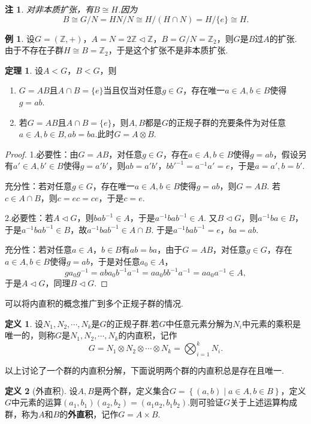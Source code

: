 \documentclass[12pt]{ctexart}
\theoremstyle{definition}
\newtheorem{definition}{定义}
\newtheorem{theorem}{定理}
\newtheorem{example}{例}
\theoremstyle{plain}
\newtheorem*{remark}{注}
\begin{document}
	\begin{remark}
		对非本质扩张，有$B\cong H$.因为
		$$B\cong G/N=HN/N\cong H/(H\cap N)=H/\{e\}\cong H.$$
	\end{remark}
	\begin{example}
		设$G=(\mathbb{Z},+)$，$A=N=2\mathbb{Z}\lhd\mathbb{Z}$，$B=G/N=\mathbb{Z}_2$，则$G$是$B$过$A$的扩张. 由于不存在子群$H\cong B=\mathbb{Z}_2$，于是这个扩张不是非本质扩张.
	\end{example}
	\begin{theorem}
		设$A<G$，$B<G$，则
		\begin{enumerate}
			\item $G=AB$且$A\cap B=\{e\}$当且仅当对任意$g\in G$，存在唯一$a\in A,b\in B$使得$g=ab$.
			\item 若$G=AB$且$A\cap B=\{e\}$，则$A,B$都是$G$的正规子群的充要条件为对任意$a\in A,b\in B,ab=ba$.此时$G=A\otimes B$.
		\end{enumerate}
	\end{theorem}
	\begin{proof}
		1.必要性：由$G=AB$，对任意$g\in G$，存在$a\in A,b\in B$使得$g=ab$，假设另有$a'\in A,b'\in B$使得$g=a'b'$，则$ab=a'b'$，$bb'^{-1}=a^{-1}a'=e$，于是$a=a',b=b'$.
		
		充分性：若对任意$g\in G$，存在唯一$a\in A,b\in B$使得$g=ab$，则$G=AB$. 若$c\in A\cap B$，则$c=ec=ce$，于是$c=e$.
		
		2.必要性：若$A\lhd G$，则$bab^{-1}\in A$，于是$a^{-1}bab^{-1}\in A$. 又$B\lhd G$，则$a^{-1}ba\in B$，于是$a^{-1}bab^{-1}\in B$，故$a^{-1}bab^{-1}\in A\cap B$. 于是$a^{-1}bab^{-1}=e$，$ba=ab$.
		
		充分性：若对任意$a\in A$，$b\in B$有$ab=ba$，由于$G=AB$，对任意$g\in G$，存在$a\in A,b\in B$使得$g=ab$，于是对任意$a_0\in A$，
		$$ga_0g^{-1}=aba_0b^{-1}a^{-1}=aa_0bb^{-1}a^{-1}=aa_0a^{-1}\in A,$$
		于是$A\lhd G$，同理$B\lhd G$.
	\end{proof}
	可以将内直积的概念推广到多个正规子群的情况.
	\begin{definition}
		设$N_1,N_2,\cdots,N_k$是$G$的正规子群.若$G$中任意元素分解为$N_i$中元素的乘积是唯一的，则称$G$是$N_1,N_2,\cdots,N_k$的内直积，记作
		$$G=N_1\otimes N_2\otimes\cdots\otimes N_k=\bigotimes_{i=1}^{k}N_i.$$
	\end{definition}
	以上讨论了一个群的内直积分解，下面说明两个群的内直积总是存在且唯一.
	\begin{definition}[外直积]
		设$A,B$是两个群，定义集合$G=\left\{(a,b)\mid a\in A,b\in B\right\}$，定义$G$中元素的运算$(a_1,b_1)(a_2,b_2)=(a_1a_2,b_1b_2)$.则可验证$G$关于上述运算构成群，称为$A$和$B$的\textbf{外直积}，记作$G=A\times B$.
	\end{definition}
\end{document}
